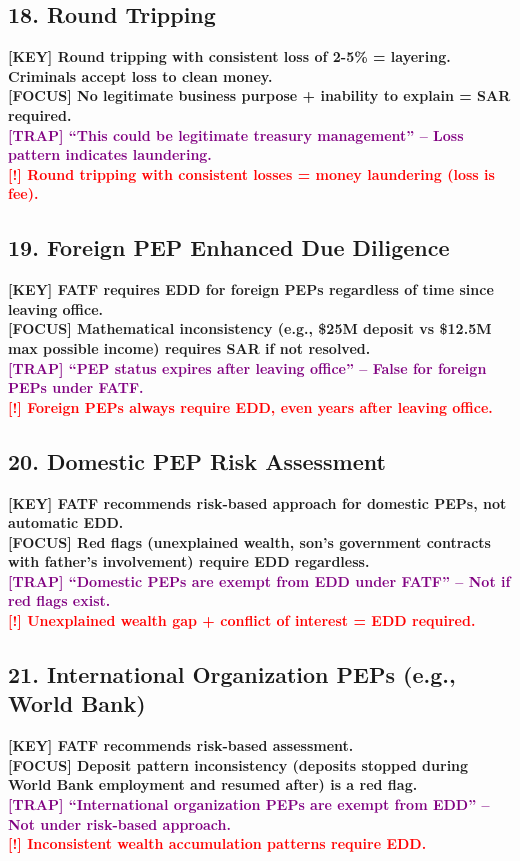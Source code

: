 \documentclass[10pt,a4paper]{article}
\newcommand{\redflag}[1]{\textcolor{red}{\textbf{[!] #1}}}
\newcommand{\examfocus}[1]{\textcolor{orange!80!black}{\textbf{[FOCUS] #1}}}
\newcommand{\trap}[1]{\textcolor{purple}{\textbf{[TRAP] #1}}}
\newcommand{\keyterm}[1]{\textcolor{red!80!black}{\textbf{[KEY] #1}}}
\begin{document}
\subsection*{18. Round Tripping}
\keyterm{Round tripping with consistent loss of 2-5\% = layering. Criminals accept loss to clean money.} \\
\examfocus{No legitimate business purpose + inability to explain = SAR required.} \\
\trap{“This could be legitimate treasury management” – Loss pattern indicates laundering.} \\
\redflag{Round tripping with consistent losses = money laundering (loss is fee).}

\subsection*{19. Foreign PEP Enhanced Due Diligence}
\keyterm{FATF requires EDD for foreign PEPs regardless of time since leaving office.} \\
\examfocus{Mathematical inconsistency (e.g., \$25M deposit vs \$12.5M max possible income) requires SAR if not resolved.} \\
\trap{“PEP status expires after leaving office” – False for foreign PEPs under FATF.} \\
\redflag{Foreign PEPs always require EDD, even years after leaving office.}

\subsection*{20. Domestic PEP Risk Assessment}
\keyterm{FATF recommends risk-based approach for domestic PEPs, not automatic EDD.} \\
\examfocus{Red flags (unexplained wealth, son’s government contracts with father’s involvement) require EDD regardless.} \\
\trap{“Domestic PEPs are exempt from EDD under FATF” – Not if red flags exist.} \\
\redflag{Unexplained wealth gap + conflict of interest = EDD required.}

\subsection*{21. International Organization PEPs (e.g., World Bank)}
\keyterm{FATF recommends risk-based assessment.} \\
\examfocus{Deposit pattern inconsistency (deposits stopped during World Bank employment and resumed after) is a red flag.} \\
\trap{“International organization PEPs are exempt from EDD” – Not under risk-based approach.} \\
\redflag{Inconsistent wealth accumulation patterns require EDD.}
\end{document}
